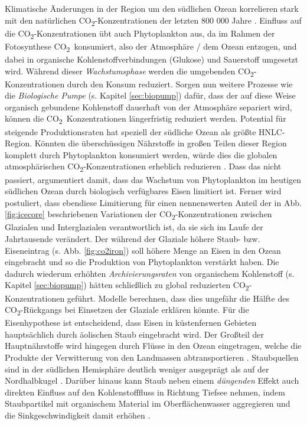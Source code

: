 \documentclass[12pt,a4paper,onecolumn]{scrartcl}
\newcommand{\cotwo}{CO\textsubscript{2}}
\begin{document}
Klimatische Änderungen in der Region um den südlichen Ozean korrelieren stark mit den natürlichen \cotwo -Konzentrationen der letzten 800 000 Jahre \citep{Fischer.2010}. Einfluss auf die \cotwo -Konzentrationen übt auch Phytoplankton aus, da im Rahmen der Fotosynthese \cotwo \ konsumiert, also der Atmosphäre / dem Ozean entzogen, und dabei in organische Kohlenstoffverbindungen (Glukose) und Sauerstoff umgesetzt wird. Während dieser \textit{Wachstumsphase} werden die umgebenden \cotwo -Konzentrationen durch den Konsum reduziert. Sorgen nun weitere Prozesse wie die \textit{Biologische Pumpe} (s. Kapitel \ref{sec:biopump}) dafür, dass der auf diese Weise organisch gebundene Kohlenstoff dauerhaft von der Atmosphäre separiert wird, können die \cotwo \ Konzentrationen längerfristig reduziert werden. Potential für steigende Produktionsraten hat speziell der südliche Ozean als größte HNLC-Region. Könnten die überschüssigen Nährstoffe in großen Teilen dieser Region komplett durch Phytoplankton konsumiert werden, würde dies die globalen atmosphärischen \cotwo -Konzentrationen erheblich reduzieren \citep{Martin.1990}. Dass das nicht passiert, argumentiert \citet{Martin.1990} damit, dass das Wachstum von Phytoplankton im heutigen südlichen Ozean durch biologisch verfügbares Eisen limitiert ist. Ferner wird postuliert, dass ebendiese Limitierung für einen nennenswerten Anteil der in Abb. \ref{fig:icecore} beschriebenen Variationen der \cotwo -Konzentrationen zwischen Glazialen und Interglazialen verantwortlich ist, da sie sich im Laufe der Jahrtausende verändert. Der während der Glaziale höhere Staub- bzw. Eiseneintrag (s. Abb. \ref{fig:co2iron}) soll höhere Menge an Eisen in den Ozean eingebracht und so die Produktion von Phytoplankton verstärkt haben. Die dadurch wiederum erhöhten \textit{Archivierungsraten} von organischem Kohlenstoff (s. Kapitel \ref{sec:biopump}) hätten schließlich zu global reduzierten \cotwo -Konzentrationen geführt. Modelle berechnen, dass dies ungefähr die Hälfte des \cotwo -Rückgangs bei Einsetzen der Glaziale erklären könnte. Für die Eisenhypothese ist entscheidend, dass Eisen in küstenfernen Gebieten hauptsächlich durch äolischen Staub eingebracht wird. Der Großteil der Hauptnährstoffe wird hingegen durch Flüsse in den Ozean eingetragen, welche die Produkte der Verwitterung von den Landmassen abtransportieren \citep{Emerson.2009}. Staubquellen sind in der südlichen Hemisphäre deutlich weniger ausgeprägt als auf der Nordhalbkugel \citep{Shao.2011}. Darüber hinaus kann Staub neben einem \textit{düngenden} Effekt auch direkten Einfluss auf den Kohlenstofffluss in Richtung Tiefsee nehmen, indem Staubpartikel mit organischem Material im Oberflächenwasser aggregieren und die Sinkgeschwindigkeit damit erhöhen \citep{vanderJagt.2018}.
\end{document}
